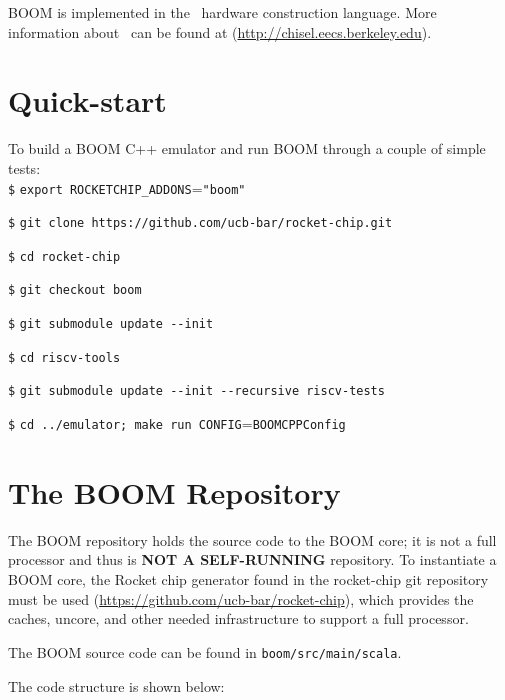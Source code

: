 BOOM is implemented in the \Chisel\ hardware construction language.  More information about \Chisel\ can be found at (\url{http://chisel.eecs.berkeley.edu}). 

\section{Quick-start}


To build a BOOM C++ emulator and run BOOM through a couple of simple tests:
\\

\texttt{\$} \verb=export ROCKETCHIP_ADDONS==\verb="boom"=

\texttt{\$} \verb=git clone https://github.com/ucb-bar/rocket-chip.git=

\texttt{\$} \verb=cd rocket-chip=

\texttt{\$} \verb=git checkout boom=

\texttt{\$} \verb=git submodule update --init=

\texttt{\$} \verb=cd riscv-tools=

\texttt{\$} \verb=git submodule update --init --recursive riscv-tests=

\texttt{\$} \verb=cd ../emulator; make run CONFIG==\verb=BOOMCPPConfig=


\section{The BOOM Repository}

The BOOM repository holds the source code to the BOOM core; it is not a full processor and thus is \textbf{NOT A SELF-RUNNING} repository.  To instantiate a BOOM core, the Rocket chip generator found in the rocket-chip git repository must be used (\url{https://github.com/ucb-bar/rocket-chip}), which provides the caches, uncore, and other needed infrastructure to support a full processor.

The BOOM source code can be found in \verb=boom/src/main/scala=.  

The code structure is shown below:

